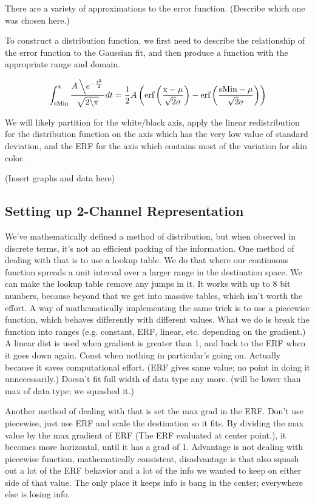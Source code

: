 \documentclass[10pt,a4paper]{article}
\begin{document}
There are a variety of approximations to the error function. (Describe which one was chosen here.)

To construct a distribution function, we first need to describe the relationship of the error function to the Gaussian fit, and then produce a function with the appropriate range and domain.

\begin{equation}\label{ErfDefinition}
  \int _{\text{sMin}}^{\text{x}}\frac{A\left\backslash e^{-\frac{t^2}{2}}\right.}{\sqrt{2\backslash \pi }}dt=\frac{1}{2} A \left(\text{erf}\left(\frac{\text{x}-\mu }{\sqrt{2} \sigma }\right)-\text{erf}\left(\frac{\text{sMin}-\mu }{\sqrt{2} \sigma }\right)\right)
\end{equation}



We will likely partition for the white/black axis, apply the linear redistribution for the distribution function on the axis which has the very low value of standard deviation, and the ERF for the axis which contains most of the variation for skin color.

(Insert graphs and data here)

\subsection{Setting up 2-Channel Representation}\label{sec:SettingUp2-ChannelRepresentation}
We've mathematically defined a method of distribution, but when observed in discrete terms, it's not an efficient packing of the information. One method of dealing with that is to use a lookup table. We do that where our continuous function spreads a unit interval over a larger range in the destination space. We can make the lookup table remove any jumps in it. It works with up to 8 bit numbers, because beyond that we get into massive tables, which isn't worth the effort. A way of mathematically implementing the same trick is to use a piecewise function, which behaves differently with different values. What we do is break the function into ranges (e.g. constant, ERF, linear, etc. depending on the gradient.) A linear dist is used when gradient is greater than 1, and back to the ERF when it goes down again. Const when nothing in particular's going on. Actually because it saves computational effort. (ERF gives same value; no point in doing it unnecessarily.) Doesn't fit full width of data type any more. (will be lower than max of data type; we squashed it.)

Another method of dealing with that is set the max grad in the ERF. Don't use piecewise, just use ERF and scale the destination so it fits. By dividing the max value by the max gradient of ERF (The ERF evaluated at center point.), it becomes more horizontal, until it has a grad of 1. Advantage is not dealing with piecewise function, mathematically consistent, disadvantage is that also squash out a lot of the ERF behavior and a lot of the info we wanted to keep on either side of that value. The only place it keeps info is bang in the center; everywhere else is losing info.
\end{document}
